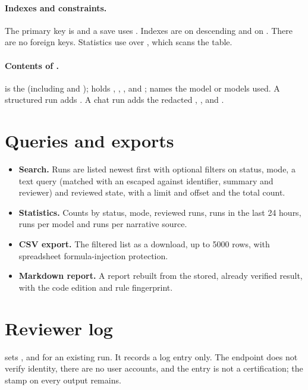 \paragraph{Indexes and constraints.} The primary key is  and a save uses . Indexes are  on  descending and  on . There are no foreign keys. Statistics use  over , which scans the table.

\paragraph{Contents of .}  is the  (including  and );  holds , , ,  and ;  names the model or models used. A structured run adds . A chat run adds the redacted , ,  and .

\section{Queries and exports}
\begin{itemize}
  \item \textbf{Search.} Runs are listed newest first with optional filters on status, mode, a text query (matched with an escaped  against identifier, summary and reviewer) and reviewed state, with a limit and offset and the total count.
  \item \textbf{Statistics.} Counts by status, mode, reviewed runs, runs in the last 24 hours, runs per model and runs per narrative source.
  \item \textbf{CSV export.} The filtered list as a download, up to 5000 rows, with spreadsheet formula-injection protection.
  \item \textbf{Markdown report.} A report rebuilt from the stored, already verified result, with the code edition and rule fingerprint.
\end{itemize}

\section{Reviewer log}
 sets ,  and  for an existing run. It records a log entry only. The endpoint does not verify identity, there are no user accounts, and the entry is not a certification; the stamp on every output remains.
